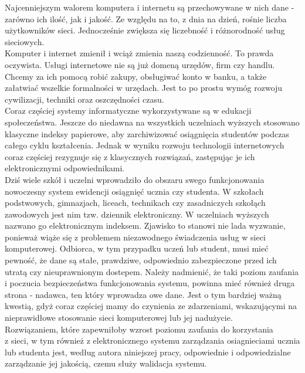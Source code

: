 \documentclass[brudnopis]{xmgr}
\begin{document}
\indent \indent \textcolor{wa}{Najcenniejszym walorem komputera i internetu są przechowywane w nich dane - zarówno
ich ilość, jak i jakość. Ze względu na to, z dnia na dzień, rośnie liczba
użytkowników sieci. Jednocześnie zwiększa się liczebność i różnorodność usług
sieciowych.}
\\
\indent \textcolor{wa}{Komputer i internet zmienił i wciąż zmienia naszą codzienność. To prawda oczywista.
Usługi internetowe nie są już domeną urzędów, firm czy handlu. Chcemy za ich pomocą
robić zakupy, obsługiwać konto w banku, a także załatwiać wszelkie formalności w
urzędach. Jest to po prostu wymóg rozwoju cywilizacji, techniki oraz oszczędności
czasu.}
\\
\indent \textcolor{wa}{Coraz częściej systemy informatyczne wykorzystywane są w edukacji społeczeństwa.
Jeszcze do niedawna na wszystkich uczelniach wyższych stosowano klasyczne indeksy
papierowe, aby zarchiwizować osiągnięcia studentów podczas całego cyklu kształcenia.
Jednak w wyniku rozwoju technologii internetowych coraz częściej rezygnuje się
z klasycznych rozwiązań, zastępując je ich elektronicznymi odpowiednikami.}
\\
\indent \textcolor{wb}{Dziś wiele szkół i uczelni wprowadziło do obszaru swego funkcjonowania nowoczesny
system ewidencji osiągnięć ucznia czy studenta. W szkołach podstwowych, gimnazjach,
liceach, technikach czy zasadniczych szkołąch zawodowych jest nim tzw. dziennik
elektroniczny. W uczelniach wyższych  nazwano go elektronicznym indeksem. Zjawisko
to stanowi nie lada wyzwanie, ponieważ wiąże się z problemem niezawodnego świadczenia
usług w sieci komputerowej. Odbiorca, w tym przypadku uczeń lub student, musi mieć
pewność, że dane są stałe, prawdziwe, odpowiednio zabezpieczone przed ich utratą
czy nieuprawnionym dostepem. Należy nadmienić, że taki poziom zaufania i poczucia
bezpieczeństwa funkcjonowania systemu, powinna mieć również druga strona - nadawca,
ten który wprowadza owe dane. Jest o tym bardziej ważną kwestią, gdyż coraz częściej
mamy do czynienia ze zdarzeniami, wskazującymi na nieprawidłowe stosowanie sieci
komputerowej lub jej nadużycie.}
\\
\indent \textcolor{wa}{Rozwiązaniem, które zapewniłoby wzrost poziomu zaufania do korzystania
\\
z sieci,
w tym również z elektronicznego systemu zarządzania osiagnieciami ucznia lub studenta
jest, według autora niniejszej pracy, odpowiednie i odpowiedzialne zarządzanie jej
jakością, czemu służy walidacja systemu.}
\\
\end{document}
